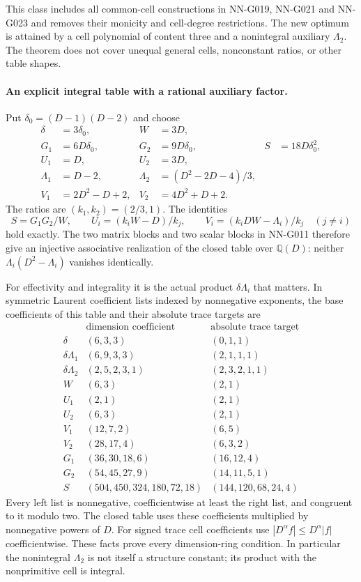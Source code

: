 This class includes all common-cell constructions in NN-G019,
NN-G021 and NN-G023 and removes their monicity and cell-degree
restrictions. The new optimum is attained by a cell polynomial
of content three and a nonintegral auxiliary $\Lambda_2$.
The theorem does not cover unequal general cells, nonconstant
ratios, or other table shapes.

\paragraph{An explicit integral table with a rational auxiliary factor.}
Put $\delta_0=(D-1)(D-2)$ and choose
\[
 \begin{aligned}
 \delta&=3\delta_0,& W&=3D,\\
 G_1&=6D\delta_0,&G_2&=9D\delta_0,&S&=18D\delta_0^2,\\
 U_1&=D,&U_2&=3D,\\
 \Lambda_1&=D-2,&\Lambda_2&=(D^2-2D-4)/3,\\
 V_1&=2D^2-D+2,&V_2&=4D^2+D+2.
 \end{aligned}                                                   \tag{G024.1}
\]
The ratios are $(k_1,k_2)=(2/3,1)$. The identities
\[
 S=G_1G_2/W,\qquad
 U_i=(k_iW-D)/k_j,\qquad
 V_i=(k_iDW-\Lambda_i)/k_j\quad(j\ne i)
\]
hold exactly. The two matrix blocks and two scalar blocks in
NN-G011 therefore give an injective associative realization
of the closed table over $\mathbb Q(D)$: neither
$\Lambda_i(D^2-\Lambda_i)$ vanishes identically.

For effectivity and integrality it is the actual product
$\delta\Lambda_i$ that matters. In symmetric Laurent
coefficient lists indexed by nonnegative exponents, the base
coefficients of this table and their absolute trace targets are
\[
\begin{array}{c|l|l}
 &\text{dimension coefficient}&\text{absolute trace target}\\\hline
 \delta &(6,3,3)&(0,1,1)\\
 \delta\Lambda_1&(6,9,3,3)&(2,1,1,1)\\
 \delta\Lambda_2&(2,5,2,3,1)&(2,3,2,1,1)\\
 W&(6,3)&(2,1)\\
 U_1&(2,1)&(2,1)\\
 U_2&(6,3)&(2,1)\\
 V_1&(12,7,2)&(6,5)\\
 V_2&(28,17,4)&(6,3,2)\\
 G_1&(36,30,18,6)&(16,12,4)\\
 G_2&(54,45,27,9)&(14,11,5,1)\\
 S&(504,450,324,180,72,18)&(144,120,68,24,4)
\end{array}                                                       \tag{G024.2}
\]
Every left list is nonnegative, coefficientwise at least the
right list, and congruent to it modulo two. The closed table
uses these coefficients multiplied by nonnegative powers of
$D$. For signed trace cell coefficients use
$|D^\alpha f|\le D^\alpha|f|$ coefficientwise. These facts
prove every dimension-ring condition. In particular the
nonintegral $\Lambda_2$ is not itself a structure constant;
its product with the nonprimitive cell is integral.

